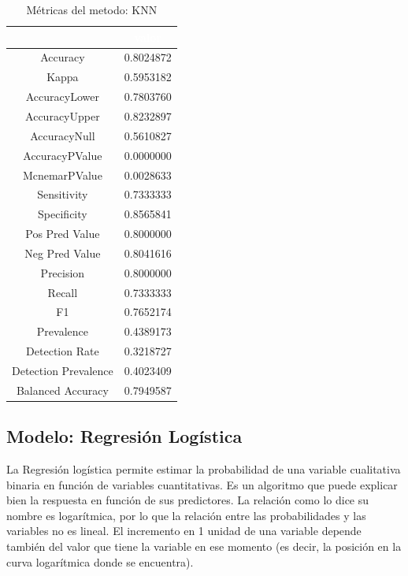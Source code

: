 \begin{table}[!h]
	
	\caption{\label{tab:metricas_KNN}Métricas del metodo: KNN }
	\centering
	\begin{tabular}[t]{cc}
		\toprule
		\rowcolor{black}  \multicolumn{1}{c}{\textcolor{white}{\textbf{metricas}}} & \multicolumn{1}{c}{\textcolor{white}{\textbf{valor}}}\\
		\midrule
		\rowcolor{gray!6}  Accuracy & 0.8024872\\
		Kappa & 0.5953182\\
		\rowcolor{gray!6}  AccuracyLower & 0.7803760\\
		AccuracyUpper & 0.8232897\\
		\rowcolor{gray!6}  AccuracyNull & 0.5610827\\
		\addlinespace
		AccuracyPValue & 0.0000000\\
		\rowcolor{gray!6}  McnemarPValue & 0.0028633\\
		Sensitivity & 0.7333333\\
		\rowcolor{gray!6}  Specificity & 0.8565841\\
		Pos Pred Value & 0.8000000\\
		\addlinespace
		\rowcolor{gray!6}  Neg Pred Value & 0.8041616\\
		Precision & 0.8000000\\
		\rowcolor{gray!6}  Recall & 0.7333333\\
		F1 & 0.7652174\\
		\rowcolor{gray!6}  Prevalence & 0.4389173\\
		\addlinespace
		Detection Rate & 0.3218727\\
		\rowcolor{gray!6}  Detection Prevalence & 0.4023409\\
		Balanced Accuracy & 0.7949587\\
		\bottomrule
	\end{tabular}
\end{table}



\subsection{Modelo: Regresión Logística}

La Regresión logística permite estimar la probabilidad de una variable cualitativa binaria en
función de variables cuantitativas. Es un algoritmo que puede explicar
bien la respuesta en función de sus predictores. La relación como lo
dice su nombre es logarítmica, por lo que la relación entre las
probabilidades y las variables no es lineal. El incremento en 1 unidad de
una variable depende también del valor que tiene la variable en ese
momento (es decir, la posición en la curva logarítmica donde se
encuentra).


